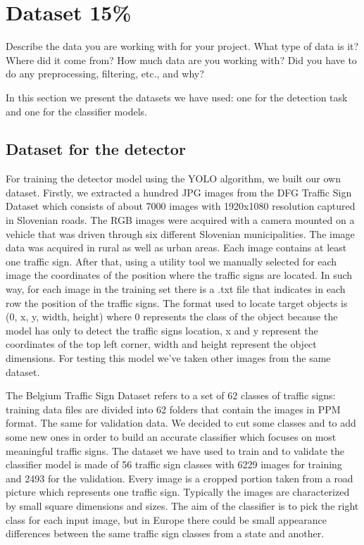 \section{Dataset 15\%}
Describe the data you are working with for your project. What type of data is it? Where did it come from? How much data are you working with? Did you have to do any preprocessing, filtering, etc., and why?

In this section we present the datasets we have used: one for the detection task and one for the classifier models. 

\subsection{Dataset for the detector}
For training the detector model using the YOLO algorithm, we built our own dataset. Firstly, we extracted a hundred JPG images from the DFG Traffic Sign Dataset which consists of about 7000 images with 1920x1080 resolution captured in Slovenian roads. The RGB images were acquired with a camera mounted on a vehicle that was driven through six different Slovenian municipalities. The image data was acquired in rural as well as urban areas. Each image contains at least one traffic sign. After that, using a utility tool we manually selected for each image the coordinates of the position where the traffic signs are located. In such way, for each image in the training set there is a .txt file that indicates in each row the position of the traffic signs. The format used to locate target objects is (0, x, y, width, height) where 0 represents the class of the object because the model has only to detect the traffic signs location, x and y represent the coordinates of the top left corner, width and height represent the object dimensions. For testing this model we've taken other images from the same dataset.

The Belgium Traffic Sign Dataset refers to a set of 62 classes of traffic signs: training data files are divided into 62 folders that contain the images in PPM format. The same for validation data. We decided to cut some classes and to add some new ones in order to build an accurate classifier which focuses on most meaningful traffic signs. The dataset we have used to train and to validate the classifier model is made of 56 traffic sign classes with 6229 images for training and 2493 for the validation. Every image is a cropped portion taken from a road picture which represents one traffic sign. Typically the images are characterized by small square dimensions and sizes. The aim of the classifier is to pick the right class for each input image, but in Europe there could be small appearance differences between the same traffic sign classes from a state and another. 

